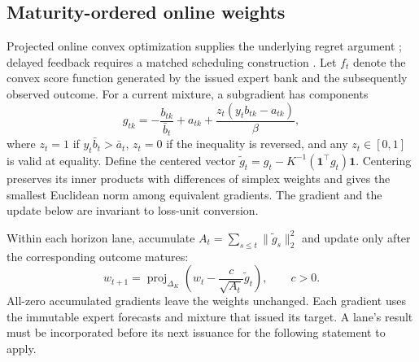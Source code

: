 \documentclass[11pt,a4paper]{article}
\theoremstyle{definition}\newtheorem{definition}[theorem]{Definition}
\begin{document}
\subsection{Maturity-ordered online weights}
Projected online convex optimization supplies the underlying regret argument \cite{zinkevich2003online}; delayed feedback requires a matched scheduling construction \cite{joulani2013delayed}. Let $f_t$ denote the convex score function generated by the issued expert bank and the subsequently observed outcome. For a current mixture, a subgradient has components
\begin{equation}
 g_{tk}=-\frac{b_{tk}}{\bar b_t}+a_{tk}
       +\frac{z_t(y_tb_{tk}-a_{tk})}{\beta},
 \label{eq:agggradient}
\end{equation}
where $z_t=1$ if $y_t\bar b_t>\bar a_t$, $z_t=0$ if the inequality is reversed, and any $z_t\in[0,1]$ is valid at equality. Define the centered vector $\widetilde g_t=g_t-K^{-1}(\boldsymbol1^\top g_t)\boldsymbol1$. Centering preserves its inner products with differences of simplex weights and gives the smallest Euclidean norm among equivalent gradients. The gradient and the update below are invariant to loss-unit conversion.

Within each horizon lane, accumulate $A_t=\sum_{s\le t}\|\widetilde g_s\|_2^2$ and update only after the corresponding outcome matures:
\begin{equation}
 w_{t+1}=\operatorname{proj}_{\Delta_K}
       \left(w_t-\frac{c}{\sqrt{A_t}}\widetilde g_t\right),\qquad c>0.
 \label{eq:aggonline}
\end{equation}
All-zero accumulated gradients leave the weights unchanged. Each gradient uses the immutable expert forecasts and mixture that issued its target. A lane's result must be incorporated before its next issuance for the following statement to apply.
\end{document}
